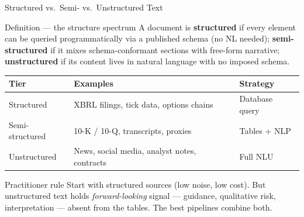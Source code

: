 \documentclass[9pt,t]{beamer}
\begin{document}
\begin{frame}{Structured vs.\ Semi- vs.\ Unstructured Text}
\begin{block}{Definition --- the structure spectrum}
A document is \textbf{structured} if every element can be queried programmatically
via a published schema (no NL needed); \textbf{semi-structured} if it mixes
schema-conformant sections with free-form narrative; \textbf{unstructured} if its
content lives in natural language with no imposed schema.
\end{block}

\medskip
\begin{tabular}{lll}
\toprule
\textbf{Tier} & \textbf{Examples} & \textbf{Strategy} \\
\midrule
Structured     & XBRL filings, tick data, options chains & Database query \\
Semi-structured& 10-K / 10-Q, transcripts, proxies       & Tables + NLP \\
Unstructured   & News, social media, analyst notes, contracts & Full NLU \\
\bottomrule
\end{tabular}

\medskip
\begin{alertblock}{Practitioner rule}
Start with structured sources (low noise, low cost). But unstructured text holds
\emph{forward-looking} signal --- guidance, qualitative risk, interpretation ---
absent from the tables. The best pipelines combine both.
\end{alertblock}
\end{frame}
\end{document}
